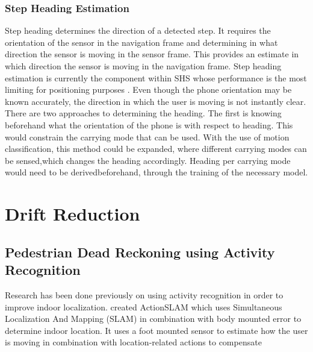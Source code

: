 \subsubsection{Step Heading Estimation}
Step heading determines the direction of a detected step. It requires the orientation of the sensor in the navigation frame and determining in what direction the sensor is moving in the sensor frame. This provides an estimate in which direction the sensor is moving in the navigation frame.  Step heading estimation is currently the component within SHS whose performance is the most limiting for positioning purposes \cite{Diez2018b, Qian2013,Combettes2017}.
Even though the phone orientation may be known accurately, the direction in which the user is moving is not instantly clear. There are two approaches to determining the heading. The first is knowing beforehand what the orientation of the phone is with respect to heading.  This would constrain the carrying mode that can be used.  With the use of motion classification, this method could be expanded, where different carrying modes can be sensed,which changes the heading accordingly. Heading per carrying mode would need to be derivedbeforehand, through the training of the necessary model. 

\section{Drift Reduction}

\subsection{Pedestrian Dead Reckoning using Activity Recognition}
Research has been done previously on using activity recognition in order to improve indoor localization. \citet{Hardegger2012} created ActionSLAM which uses Simultaneous Localization And Mapping (SLAM) in combination with body mounted error to determine indoor location. It uses a foot mounted sensor to estimate how the user is moving in combination with location-related actions to compensate 



